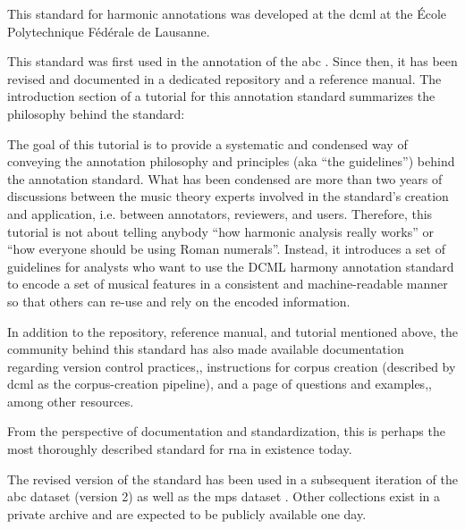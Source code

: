 

This standard for harmonic annotations was developed at the
\gls{dcml} at the \'Ecole Polytechnique F\'ed\'erale de
Lausanne.

This standard was first used in the annotation of the
\gls{abc}
\parencite{neuwirth2018annotated}. Since then, it has been
revised and documented in a dedicated
repository
and a reference
manual.
The introduction section of a tutorial for this annotation
standard summarizes the philosophy behind the
standard:

\begin{italicsquote}
    The goal of this tutorial is to provide a systematic and
    condensed way of conveying the annotation philosophy and
    principles (aka ``the guidelines'') behind the
    annotation standard. What has been condensed are more
    than two years of discussions between the music theory
    experts involved in the standard's creation and
    application, i.e. between annotators, reviewers, and
    users. Therefore, this tutorial is not about telling
    anybody ``how harmonic analysis really works'' or ``how
    everyone should be using Roman numerals''. Instead, it
    introduces a set of guidelines for analysts who want to
    use the DCML harmony annotation standard to encode a set
    of musical features in a consistent and machine-readable
    manner so that others can re-use and rely on the encoded
    information.
\end{italicsquote}

In addition to the repository, reference manual, and
tutorial mentioned above, the community behind this standard
has also made available documentation regarding version
control
practices,,
instructions for corpus creation (described by \gls{dcml} as
the corpus-creation
pipeline),
and a page of questions and
examples,,
among other resources.

From the perspective of documentation and standardization,
this is perhaps the most thoroughly described standard for
\gls{rna} in existence today.

The revised version of the standard has been used in a
subsequent iteration of the \gls{abc} dataset (version 2) as
well as the \gls{mps} dataset
\parencite{hentschel2021annotated}. Other collections exist
in a private archive and are expected to be publicly
available one day.
